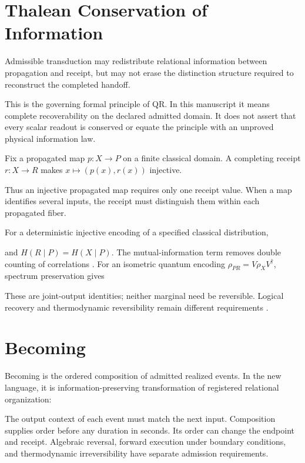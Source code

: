 \section{Thalean Conservation of Information}\label{sec:information}
\begin{principle}[title=Thalean conservation of information]
Admissible transduction may redistribute relational information between propagation and receipt, but may not erase the distinction structure required to reconstruct the completed handoff.
\end{principle}
This is the governing formal principle of QR. In this manuscript it means complete recoverability on the declared admitted domain. It does not assert that every scalar readout is conserved or equate the principle with an unproved physical information law.



Fix a propagated map $p:X\to P$ on a finite classical domain. A completing receipt $r:X\to R$ makes $x\mapsto(p(x),r(x))$ injective.

Thus an injective propagated map requires only one receipt value. When a map identifies several inputs, the receipt must distinguish them within each propagated fiber.

For a deterministic injective encoding of a specified classical distribution,

and $H(R\mid P)=H(X\mid P)$. The mutual-information term removes double counting of correlations \citep{shannon1948}. For an isometric quantum encoding $\rho_{PR}=V\rho_XV^\dagger$, spectrum preservation gives

These are joint-output identities; neither marginal need be reversible. Logical recovery and thermodynamic reversibility remain different requirements \citep{bennett1973,watrous2018}.



\section{Becoming}
Becoming is the ordered composition of admitted realized events. In the new language, it is information-preserving transformation of registered relational organization:

The output context of each event must match the next input. Composition supplies order before any duration in seconds. Its order can change the endpoint and receipt. Algebraic reversal, forward execution under boundary conditions, and thermodynamic irreversibility have separate admission requirements.

